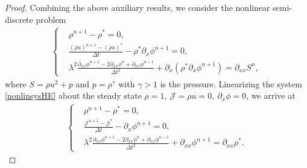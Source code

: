 \documentclass[10pt,a4paper]{amsart}
\begin{document}
\begin{proof}
Combining the above auxiliary results, we consider the nonlinear semi-discrete problem
\begin{align}\label{nonlinsysHE}
    \left\{
        \begin{aligned}
            &\rho^{n+1}-\rho^*=0,\\
            &\frac{(\rho u)^{n+1}-(\rho u)^*}{\Delta t}-\rho^*\partial_x\phi^{n+1}=0,\\
            &\lambda^2\frac{\partial_{xx}\phi^{n+1}-2\partial_{xx}\phi^n+\partial_{xx}\phi^{n-1}}{\Delta t^2}+\partial_x(\rho^*\partial_x\phi^{n+1})=\partial_{xx}S^n,
        \end{aligned}
    \right.
\end{align}
where $S=\rho u^2+p$ and $p=\rho^{\gamma}$ with $\gamma>1$ is the pressure.
Linearizing the system \eqref{nonlinsysHE} about the steady state $\rho=1,~\mathcal{J}=\rho u=0,~\partial_x\phi=0$, we arrive at
\begin{align}
    \left\{
        \begin{aligned}
            &\rho^{n+1}-\rho^*=0,\\
            &\frac{\mathcal{J}^{n+1}-\mathcal{J}^*}{\Delta t}-\partial_x\phi^{n+1}=0,\\
            &\lambda^2\frac{\partial_{xx}\phi^{n+1}-2\partial_{xx}\phi^n+\partial_{xx}\phi^{n-1}}{\Delta t^2}+\partial_{xx}\phi^{n+1}=\partial_{xx}\rho^*.
        \end{aligned}
    \right.
\end{align}


\end{proof}
\end{document}
